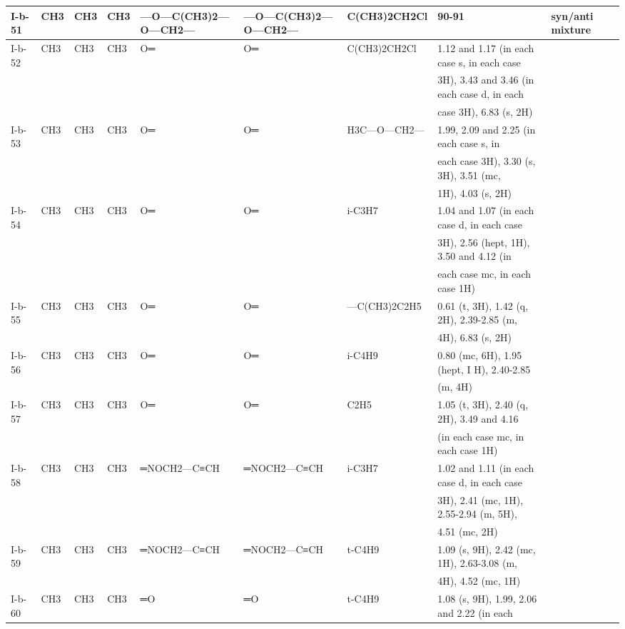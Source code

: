 \documentclass[11pt,a4paper]{article}
\begin{document}
\begin{table}[h]
\begin{tabular}{|l|l|l|l|l|l|l|l|l|}
I-b-51 & CH3 & CH3 & CH3 & —O—C(CH3)2—O—CH2— & —O—C(CH3)2—O—CH2— & C(CH3)2CH2Cl & 90-91 & syn/anti mixture \\ \hline
I-b-52 & CH3 & CH3 & CH3 & O═ & O═ & C(CH3)2CH2Cl & 1.12 and 1.17 (in each case s, in each case &  \\ \hline
 &  &  &  &  &  &  & 3H), 3.43 and 3.46 (in each case d, in each &  \\ \hline
 &  &  &  &  &  &  & case 3H), 6.83 (s, 2H) &  \\ \hline
I-b-53 & CH3 & CH3 & CH3 & O═ & O═ & H3C—O—CH2— & 1.99, 2.09 and 2.25 (in each case s, in &  \\ \hline
 &  &  &  &  &  &  & each case 3H), 3.30 (s, 3H), 3.51 (mc, &  \\ \hline
 &  &  &  &  &  &  & 1H), 4.03 (s, 2H) &  \\ \hline
I-b-54 & CH3 & CH3 & CH3 & O═ & O═ & i-C3H7 & 1.04 and 1.07 (in each case d, in each case &  \\ \hline
 &  &  &  &  &  &  & 3H), 2.56 (hept, 1H), 3.50 and 4.12 (in &  \\ \hline
 &  &  &  &  &  &  & each case mc, in each case 1H) &  \\ \hline
I-b-55 & CH3 & CH3 & CH3 & O═ & O═ & —C(CH3)2C2H5 & 0.61 (t, 3H), 1.42 (q, 2H), 2.39-2.85 (m, &  \\ \hline
 &  &  &  &  &  &  & 4H), 6.83 (s, 2H) &  \\ \hline
I-b-56 & CH3 & CH3 & CH3 & O═ & O═ & i-C4H9 & 0.80 (mc, 6H), 1.95 (hept, I H), 2.40-2.85 &  \\ \hline
 &  &  &  &  &  &  & (m, 4H) &  \\ \hline
I-b-57 & CH3 & CH3 & CH3 & O═ & O═ & C2H5 & 1.05 (t, 3H), 2.40 (q, 2H), 3.49 and 4.16 &  \\ \hline
 &  &  &  &  &  &  & (in each case mc, in each case 1H) &  \\ \hline
I-b-58 & CH3 & CH3 & CH3 & ═NOCH2—C≡CH & ═NOCH2—C≡CH & i-C3H7 & 1.02 and 1.11 (in each case d, in each case &  \\ \hline
 &  &  &  &  &  &  & 3H), 2.41 (mc, 1H), 2.55-2.94 (m, 5H), &  \\ \hline
 &  &  &  &  &  &  & 4.51 (mc, 2H) &  \\ \hline
I-b-59 & CH3 & CH3 & CH3 & ═NOCH2—C≡CH & ═NOCH2—C≡CH & t-C4H9 & 1.09 (s, 9H), 2.42 (mc, 1H), 2.63-3.08 (m, &  \\ \hline
 &  &  &  &  &  &  & 4H), 4.52 (mc, 1H) &  \\ \hline
I-b-60 & CH3 & CH3 & CH3 & ═O & ═O & t-C4H9 & 1.08 (s, 9H), 1.99, 2.06 and 2.22 (in each &  \\ \hline

\end{tabular}
\end{table}
\end{document}
